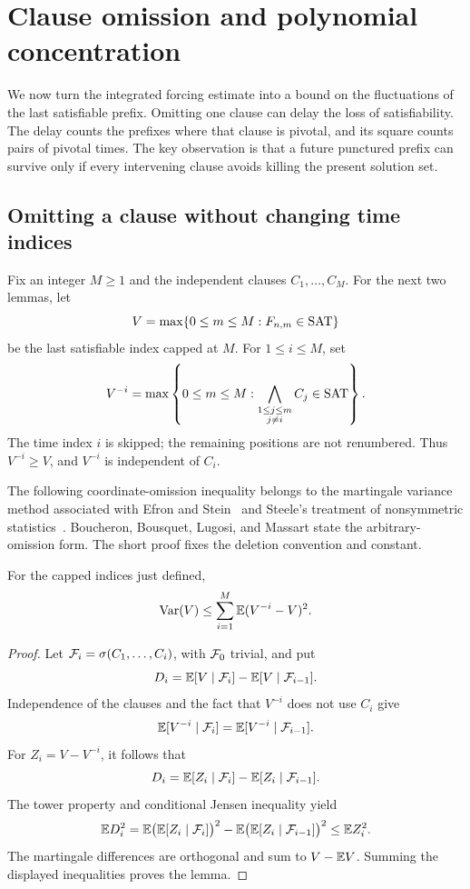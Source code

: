 \section{Clause omission and polynomial concentration}\label{sec:concentration}

We now turn the integrated forcing estimate into a bound on the
fluctuations of the last satisfiable prefix. Omitting one clause can
delay the loss of satisfiability. The delay counts the prefixes where
that clause is pivotal, and its square counts pairs of pivotal times.
The key observation is that a future punctured prefix can survive only
if every intervening clause avoids killing the present solution set.

\subsection{Omitting a clause without changing time indices}

Fix an integer \(M\ge1\) and the independent clauses \(C_1,\ldots,C_M\).
For the next two lemmas, let
\[
 V=\max\{0\le m\le M:F_{n,m}\in\mathrm{SAT}\}
\]
be the last satisfiable index capped at \(M\). For \(1\le i\le M\), set
\[
 V^{-i}=\max\left\{0\le m\le M:
       \bigwedge_{\substack{1\le j\le m\\j\ne i}}C_j\in\mathrm{SAT}\right\}.
\]
The time index \(i\) is skipped; the remaining positions are not
renumbered. Thus \(V^{-i}\ge V\), and \(V^{-i}\) is independent of
\(C_i\).

The following coordinate-omission inequality belongs to the martingale
variance method associated with Efron and Stein~\cite{EfronStein} and
Steele's treatment of nonsymmetric statistics~\cite{Steele}.
Boucheron, Bousquet, Lugosi, and Massart
\cite[Section~3.2, equation~(3.6)]{BBLM} state the arbitrary-omission
form. The short proof fixes the deletion convention and constant.

\begin{lemma}\label{lem:variance-deletion}
For the capped indices just defined,
\[
 \operatorname{Var}(V)\le\sum_{i=1}^{M}\mathbb E(V^{-i}-V)^2.
\]
\end{lemma}

\begin{proof}
Let \(\mathcal F_i=\sigma(C_1,\ldots,C_i)\), with \(\mathcal F_0\) trivial, and put
\[
 D_i=\mathbb E[V\mid\mathcal F_i]-\mathbb E[V\mid\mathcal F_{i-1}].
\]
Independence of the clauses and the fact that \(V^{-i}\) does not use
\(C_i\) give
\[
 \mathbb E[V^{-i}\mid\mathcal F_i]=\mathbb E[V^{-i}\mid\mathcal F_{i-1}].
\]
For \(Z_i=V-V^{-i}\), it follows that
\[
 D_i=\mathbb E[Z_i\mid\mathcal F_i]-\mathbb E[Z_i\mid\mathcal F_{i-1}].
\]
The tower property and conditional Jensen inequality yield
\[
 \mathbb E D_i^2
 =\mathbb E\bigl(\mathbb E[Z_i\mid\mathcal F_i]\bigr)^2
  -\mathbb E\bigl(\mathbb E[Z_i\mid\mathcal F_{i-1}]\bigr)^2
 \le\mathbb E Z_i^2.
\]
The martingale differences are orthogonal and sum to \(V-\mathbb E V\).
Summing the displayed inequalities proves the lemma.
\end{proof}

